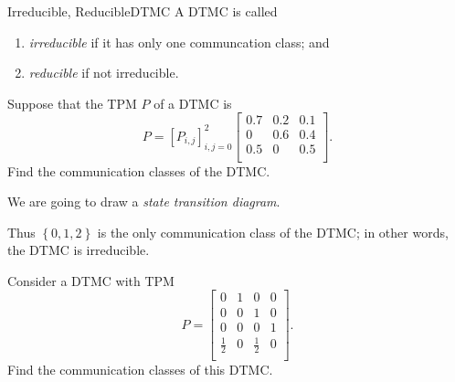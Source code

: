 \documentclass[stat333]{subfiles}
\begin{document}
    \begin{definition}{Irreducible, Reducible}{DTMC}
        A DTMC is called
        \begin{enumerate}
            \item \emph{irreducible} if it has only one communcation class; and
            \item \emph{reducible} if not irreducible.
        \end{enumerate}
    \end{definition}

    \ex Suppose that the TPM $P$ of a DTMC is
    \begin{equation*}
        P = \left[ P_{i,j} \right]^{2}_{i,j=0}
        \begin{bmatrix}
        	0.7 & 0.2 & 0.1 \\
        	0 & 0.6 & 0.4 \\
        	0.5 & 0 & 0.5 \\
        \end{bmatrix}.
    \end{equation*}
    Find the communication classes of the DTMC.

    \begin{subproof}[Answer]
        We are going to draw a \textit{state transition diagram}.
        \begin{center}
        \end{center}
        Thus $\left\lbrace 0,1,2 \right\rbrace$ is the only communication class of the DTMC; in other words, the DTMC is irreducible.
    \end{subproof}

    \ex Consider a DTMC with TPM
    \begin{equation*}
        P =
        \begin{bmatrix}
        	0 & 1 & 0 & 0 \\
        	0 & 0 & 1 & 0 \\
        	0 & 0 & 0 & 1 \\
        	\frac{1}{2} & 0 & \frac{1}{2} & 0 \\
        \end{bmatrix}.
    \end{equation*}
    Find the communication classes of this DTMC.
\end{document}
